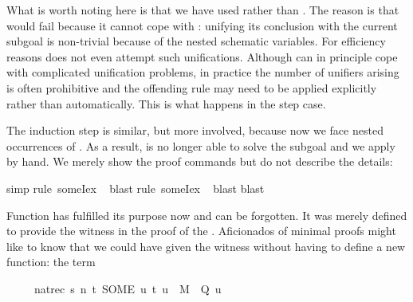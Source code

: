 \begin{isabellebody}
\begin{isamarkuptxt}
\noindent
What is worth noting here is that we have used  rather than
.  The reason is that  would fail because it cannot
cope with : unifying its conclusion with the current
subgoal is non-trivial because of the nested schematic variables. For
efficiency reasons  does not even attempt such unifications.
Although  can in principle cope with complicated unification
problems, in practice the number of unifiers arising is often prohibitive and
the offending rule may need to be applied explicitly rather than
automatically. This is what happens in the step case.

The induction step is similar, but more involved, because now we face nested
occurrences of . As a result,  is no longer able to
solve the subgoal and we apply  by hand.  We merely
show the proof commands but do not describe the details:%
\end{isamarkuptxt}%
\isamarkuptrue%
\isamarkupfalse%
{}simp{}\isanewline
{}\isamarkupfalse%
{}rule\ someI{}{}ex{}\isanewline
\ \isamarkupfalse%
{}blast{}\isanewline
{}\isamarkupfalse%
{}rule\ someI{}{}ex{}\isanewline
\ \isamarkupfalse%
{}blast{}\isanewline
{}\isamarkupfalse%
{}blast{}\isanewline
{}\isamarkupfalse%
%
\endisatagproof
{\isafoldproof}%
%
\isadelimproof
%
\endisadelimproof
%
\begin{isamarkuptext}%
Function  has fulfilled its purpose now and can be forgotten.
It was merely defined to provide the witness in the proof of the
. Aficionados of minimal proofs might like to know
that we could have given the witness without having to define a new function:
the term
\begin{isabelle}%
\ \ \ \ \ nat{}rec\ s\ {}{}n\ t{}\ SOME\ u{}\ {}t{}\ u{}\ {}\ M\ {}\ Q\ u{}%

\end{isabelle}
\end{isamarkuptext}
\end{isabellebody}
